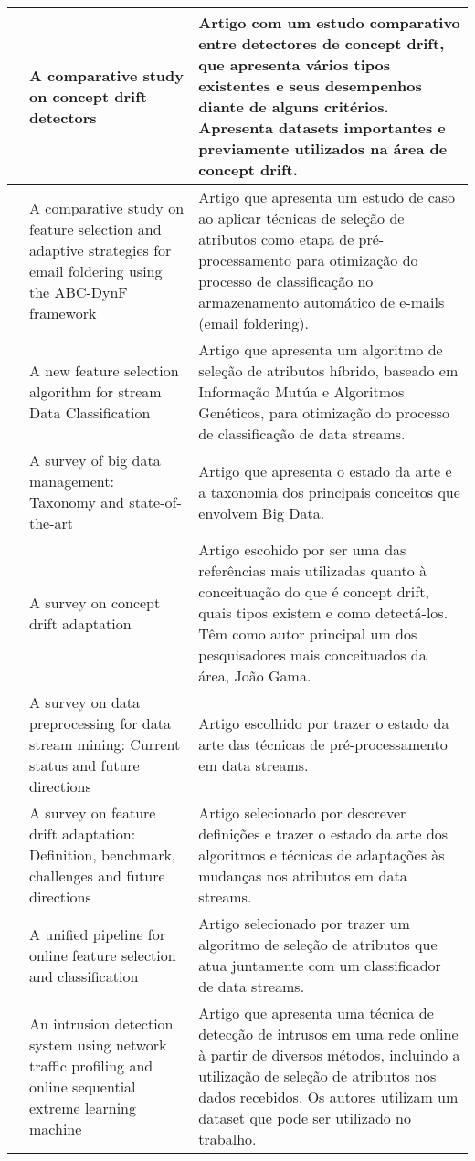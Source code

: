 \begin{longtable}[c]{|p{2.7cm}|p{5cm}|p{7cm}|}
\hline
\cite{Goncalves2014}  & A comparative study on concept drift detectors & Artigo com um estudo comparativo entre detectores de concept drift, que apresenta vários tipos existentes e seus desempenhos diante de alguns critérios. Apresenta datasets importantes e previamente utilizados na área de concept drift.         
\\ \hline
\cite{Carmona-Cejudo2013} & A comparative study on feature selection and adaptive strategies for email foldering using the ABC-DynF framework & Artigo que apresenta um estudo de caso ao aplicar técnicas de seleção de atributos como etapa de pré-processamento para otimização do processo de classificação no armazenamento automático de e-mails (email foldering).
\\ \hline
\cite{Wankhade2013} & A new feature selection algorithm for stream Data Classification & Artigo que apresenta um algoritmo de seleção de atributos híbrido, baseado em Informação Mutúa e Algoritmos Genéticos, para otimização do processo de classificação de data streams.
\\ \hline
\cite{Siddiqa2016} & A survey of big data management: Taxonomy and state-of-the-art & Artigo que apresenta o estado da arte e a taxonomia dos principais conceitos que envolvem Big Data.
\\ \hline
\cite{Gama2014} & A survey on concept drift adaptation & Artigo escohido por ser uma das referências mais utilizadas quanto à conceituação do que é concept drift, quais tipos existem e como detectá-los. Têm como autor principal um dos pesquisadores mais conceituados da área, João Gama.
\\ \hline
\cite{Ramirez-Gallego2017} & A survey on data preprocessing for data stream mining: Current status and future directions & Artigo escolhido por trazer o estado da arte das técnicas de pré-processamento em data streams.
\\ \hline
\cite{Barddal2017} & A survey on feature drift adaptation: Definition, benchmark, challenges and future directions & Artigo selecionado por descrever definições e trazer o estado da arte dos algoritmos e técnicas de adaptações às mudanças nos atributos em data streams.
\\ \hline
\cite{Bolon-Canedo2016} & A unified pipeline for online feature selection and classification & Artigo selecionado por trazer um algoritmo de seleção de atributos que atua juntamente com um classificador de data streams.
\\ \hline
\cite{Singh2015} & An intrusion detection system using network traffic profiling and online sequential extreme learning machine & Artigo que apresenta uma técnica de detecção de intrusos em uma rede online à partir de diversos métodos, incluindo a utilização de seleção de atributos nos dados recebidos. Os autores utilizam um dataset que pode ser utilizado no trabalho.

\end{longtable}

